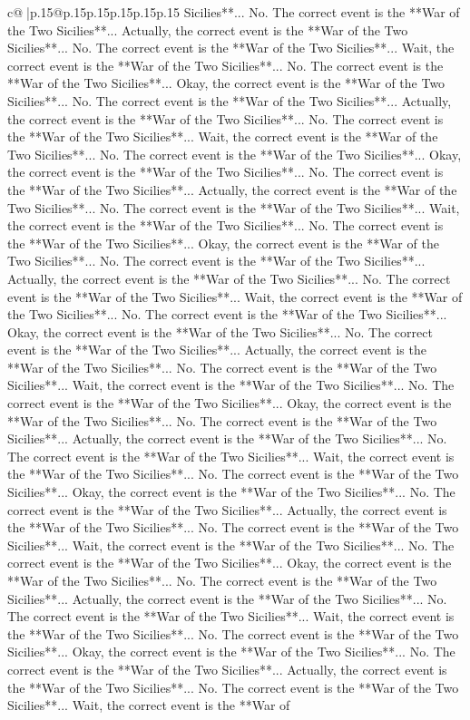 \documentclass{article}
\begin{document}
{\begin{supertabular}{c@{$\;$}|p{.15\linewidth}@{}p{.15\linewidth}p{.15\linewidth}p{.15\linewidth}p{.15\linewidth}p{.15\linewidth}}
{{{Sicilies**... No. The correct event is the **War of the Two Sicilies**... Actually, the correct event is the **War of the Two Sicilies**... No. The correct event is the **War of the Two Sicilies**... Wait, the correct event is the **War of the Two Sicilies**... No. The correct event is the **War of the Two Sicilies**... Okay, the correct event is the **War of the Two Sicilies**... No. The correct event is the **War of the Two Sicilies**... Actually, the correct event is the **War of the Two Sicilies**... No. The correct event is the **War of the Two Sicilies**... Wait, the correct event is the **War of the Two Sicilies**... No. The correct event is the **War of the Two Sicilies**... Okay, the correct event is the **War of the Two Sicilies**... No. The correct event is the **War of the Two Sicilies**... Actually, the correct event is the **War of the Two Sicilies**... No. The correct event is the **War of the Two Sicilies**... Wait, the correct event is the **War of the Two Sicilies**... No. The correct event is the **War of the Two Sicilies**... Okay, the correct event is the **War of the Two Sicilies**... No. The correct event is the **War of the Two Sicilies**... Actually, the correct event is the **War of the Two Sicilies**... No. The correct event is the **War of the Two Sicilies**... Wait, the correct event is the **War of the Two Sicilies**... No. The correct event is the **War of the Two Sicilies**... Okay, the correct event is the **War of the Two Sicilies**... No. The correct event is the **War of the Two Sicilies**... Actually, the correct event is the **War of the Two Sicilies**... No. The correct event is the **War of the Two Sicilies**... Wait, the correct event is the **War of the Two Sicilies**... No. The correct event is the **War of the Two Sicilies**... Okay, the correct event is the **War of the Two Sicilies**... No. The correct event is the **War of the Two Sicilies**... Actually, the correct event is the **War of the Two Sicilies**... No. The correct event is the **War of the Two Sicilies**... Wait, the correct event is the **War of the Two Sicilies**... No. The correct event is the **War of the Two Sicilies**... Okay, the correct event is the **War of the Two Sicilies**... No. The correct event is the **War of the Two Sicilies**... Actually, the correct event is the **War of the Two Sicilies**... No. The correct event is the **War of the Two Sicilies**... Wait, the correct event is the **War of the Two Sicilies**... No. The correct event is the **War of the Two Sicilies**... Okay, the correct event is the **War of the Two Sicilies**... No. The correct event is the **War of the Two Sicilies**... Actually, the correct event is the **War of the Two Sicilies**... No. The correct event is the **War of the Two Sicilies**... Wait, the correct event is the **War of the Two Sicilies**... No. The correct event is the **War of the Two Sicilies**... Okay, the correct event is the **War of the Two Sicilies**... No. The correct event is the **War of the Two Sicilies**... Actually, the correct event is the **War of the Two Sicilies**... No. The correct event is the **War of the Two Sicilies**... Wait, the correct event is the **War of }}}
\end{supertabular}}
\end{document}
